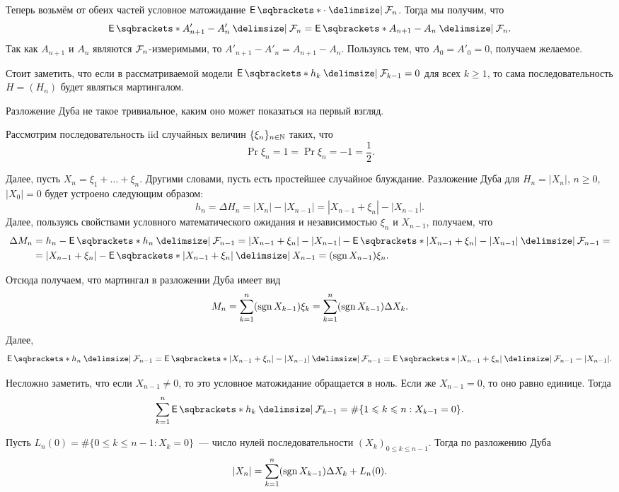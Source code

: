 Теперь возьмём от обеих частей условное матожидание \(\E{\cdot \given 
\F_{n}}\). Тогда мы получим, что
\[
	\E{A'_{n + 1} - A'_{n} \given \F_{n}} = \E{A_{n + 1} - A_{n} \given \F_{n}}.
\]
Так как \(A_{n + 1}\) и \(A_{n}\) являются \(\mathcal{F}_{n}\)-измеримыми, то \(A'_{n + 
1} - A'_{n} = A_{n + 1} - A_{n}\). Пользуясь тем, что \(A_{0} = A'_{0} = 0\), 
получаем желаемое.

Стоит заметить, что если в рассматриваемой модели \(\E{h_{k} \given \F_{k - 1}} 
= 0\) для всех \(k \geq 1\), то сама последовательность \(H = (H_{n})\) будет 
являться мартингалом.

Разложение Дуба не такое тривиальное, каким оно может показаться на первый 
взгляд.
\begin{example}
	Рассмотрим последовательность iid случайных величин \(\{\xi_{n}\}_{n \in 
	\mathbb{N}}\) таких, что
	\[
		\Pr{\xi_{n} = 1} = \Pr{\xi_{n}= -1} = \frac{1}{2}.
	\]
	
	Далее, пусть \(X_{n} = \xi_{1} + \ldots + \xi_{n}\). Другими словами, пусть 
	есть простейшее случайное блуждание. Разложение Дуба для \(H_{n} = 
	|X_{n}|\), \(n \geq 0\), \(|X_{0}| = 0\) будет устроено следующим образом:
	\[
		h_{n} = \Delta H_{n} = |X_{n}| - |X_{n - 1}| = |X_{n - 1} + \xi_{n}| - 
		|X_{n - 1}|.
	\]
	Далее, пользуясь свойствами условного математического ожидания и 
	независимостью \(\xi_{n}\) и \(X_{n - 1}\), получаем, что
	\begin{align*}
		\Delta M_{n} &= h_{n} - \E{h_{n} \given \F_{n - 1}} = |X_{n - 1} + 
		\xi_{n}| - |X_{n - 1}| - \E{|X_{n - 1} + \xi_{n}| - |X_{n - 1}| \given 
		\F_{n - 1}} = \\
		&= |X_{n - 1} + \xi_{n}| - \E{|X_{n - 1} + \xi_{n}| \given X_{n - 1}} = 
		(\sgn{X_{n - 1}})\xi_{n}.
	\end{align*}
	
	Отсюда получаем, что мартингал в разложении Дуба имеет вид
	\[
		M_{n} = \sum_{k = 1}^{n} (\operatorname{sgn}{X_{k - 1}})\xi_{k} = \sum_{k = 1}^{n} 
		(\operatorname{sgn}{X_{k - 1}})\Delta X_{k}.
	\]
	
	Далее,
	\[
		\E{h_{n} \given \F_{n - 1}} = \E{|X_{n - 1} + \xi_{n}| - |X_{n - 1}| 
		\given \F_{n - 1}} = \E{|X_{n - 1} + \xi_{n}| \given \F_{n - 1}} - 
		|X_{n - 1}|.
	\]
	
	Несложно заметить, что если \(X_{n - 1} \neq 0\), то это условное 
	матожидание обращается в ноль. Если же \(X_{n -1} = 0\), то оно равно 
	единице. Тогда 
	\[
		\sum_{k = 1}^{n} \E{h_{k} \given \F_{k - 1}} = \#\{1 \leq k \leq n: 
		X_{k - 1} = 0\}.
	\]
	
	Пусть \(L_{n}(0) = \#\{0 \leq k \leq n - 1: X_{k} = 0\}\)~--- число нулей 
	последовательности \((X_{k})_{0 \leq k \leq n - 1}\). Тогда по разложению 
	Дуба
	\[
		|X_{n}| = \sum_{k = 1}^{n} (\operatorname{sgn}{X_{k - 1}})\Delta X_{k} + L_{n}(0).
	\]
	

\end{example}
